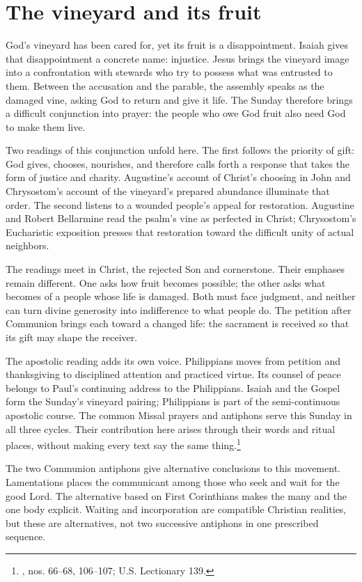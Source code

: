 \section{The vineyard and its fruit}
God's vineyard has been cared for, yet its fruit is a disappointment. Isaiah gives that disappointment a concrete name: injustice. Jesus brings the vineyard image into a confrontation with stewards who try to possess what was entrusted to them. Between the accusation and the parable, the assembly speaks as the damaged vine, asking God to return and give it life. The Sunday therefore brings a difficult conjunction into prayer: the people who owe God fruit also need God to make them live.

Two readings of this conjunction unfold here. The first follows the priority of gift: God gives, chooses, nourishes, and therefore calls forth a response that takes the form of justice and charity. Augustine's account of Christ's choosing in John and Chrysostom's account of the vineyard's prepared abundance illuminate that order. The second listens to a wounded people's appeal for restoration. Augustine and Robert Bellarmine read the psalm's vine as perfected in Christ; Chrysostom's Eucharistic exposition presses that restoration toward the difficult unity of actual neighbors.

The readings meet in Christ, the rejected Son and cornerstone. Their emphases remain different. One asks how fruit becomes possible; the other asks what becomes of a people whose life is damaged. Both must face judgment, and neither can turn divine generosity into indifference to what people do. The petition after Communion brings each toward a changed life: the sacrament is received so that its gift may shape the receiver.

The apostolic reading adds its own voice. Philippians moves from petition and thanksgiving to disciplined attention and practiced virtue. Its counsel of peace belongs to Paul's continuing address to the Philippians. Isaiah and the Gospel form the Sunday's vineyard pairing; Philippians is part of the semi-continuous apostolic course. The common Missal prayers and antiphons serve this Sunday in all three cycles. Their contribution here arises through their words and ritual places, without making every text say the same thing.\footnote{, nos. 66--68, 106--107; U.S. Lectionary 139.}

The two Communion antiphons give alternative conclusions to this movement. Lamentations places the communicant among those who seek and wait for the good Lord. The alternative based on First Corinthians makes the many and the one body explicit. Waiting and incorporation are compatible Christian realities, but these are alternatives, not two successive antiphons in one prescribed sequence.
